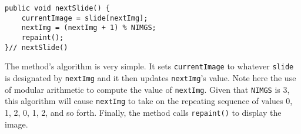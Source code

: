 \begin{jjjlisting}
\begin{lstlisting}
public void nextSlide() {
    currentImage = slide[nextImg];
    nextImg = (nextImg + 1) % NIMGS;
    repaint();
}// nextSlide()
\end{lstlisting}
\end{jjjlisting}

\noindent The method's algorithm is very simple.  It sets
{\tt currentImage} to whatever {\tt slide} is designated by
{\tt nextImg} and it then updates {\tt nextImg}'s value.   Note here the use
of modular arithmetic to compute the value of {\tt nextImg}. Given
that {\tt NIMGS} is 3, this algorithm will cause {\tt nextImg} to take
on the repeating sequence of values 0, 1, 2, 0, 1, 2, and so forth.
Finally, the method calls {\tt repaint()} to display the image.

